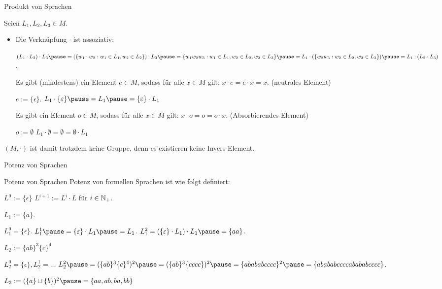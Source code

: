 \begin{frame}{Produkt von Sprachen}
	\pause 
	
	Seien $L_1, L_2, L_3 \in M$.
	
	\begin{itemize}
		\item Die Verknüpfung $\cdot$ ist assoziativ:
		\begin{itemize}
			\pitem $(L_1 \cdot L_2) \cdot L_3 \pause = (\{w_1\cdot w_2 : w_1 \in L_1, w_2 \in L_2\}) \cdot L_3 \pause = \{w_1w_2w_3 : w_1 \in L_1, w_2 \in L_2, w_3 \in L_3\} \pause = L_1 \cdot (\{w_2w_3 : w_2 \in L_2, w_3 \in L_3\}) \pause = L_1 \cdot (L_2 \cdot L_3)$.
		\end{itemize}
	
		\pitem Es gibt (mindestens) ein Element $e \in M$, sodass für alle $x \in M$ gilt: $x \cdot e = e \cdot x = x$. (neutrales Element)
		\begin{itemize}
			\pitem $e := \{\epsilon\}$.
			\pitem $L_1 \cdot \{\epsilon\} \pause = L_1 \pause = \{\epsilon\} \cdot L_1$
		\end{itemize}
	
		\pitem Es gibt ein Element $o \in M$, sodass für alle $x \in M$ gilt: $x \cdot o = o = o \cdot x$. (Absorbierendes Element)
		\begin{itemize}
			\pitem $o := \emptyset$
			\pitem $L_1 \cdot \emptyset = \emptyset = \emptyset \cdot L_1$
		\end{itemize}
	\end{itemize}

	$(M, \cdot)$ ist damit trotzdem keine Gruppe\p , denn es existieren keine Invers-Element.
\end{frame}

\begin{frame}{Potenz von Sprachen}
	
	\begin{block}{Potenz von Sprachen}
		Potenz von formellen Sprachen ist wie folgt definiert:
		\begin{itemize}
			\pitem $L^0 := \{\epsilon\}$
			\pitem $L^{i+1} := L^i \cdot L$ für $i \in \mathbb{N}_+$.
		\end{itemize}
	\end{block}

	\begin{itemize}
		\pitem $L_1 := \{a\}$.
		\begin{itemize}
			\pitem $L_1^0 = \{\epsilon\}$. \pause $L_1^1 \pause = \{\epsilon\} \cdot L_1 \pause = L_1$.
			\pitem $L_1^2 = (\{\epsilon\} \cdot L_1) \cdot L_1 \pause = \{aa\}$.
		\end{itemize}
		\pitem $L_2 := \{ab\}^3\{c\}^4$
		\begin{itemize}
			\pitem $L_2^0 = \{\epsilon\}, L_2^1 = ...$
			\pitem $L_2^2 \pause = (\{ab\}^3\{c\}^4)^2 \pause = (\{ab\}^3\{cccc\})^2 \pause = \{abababcccc\}^2 \pause = \{abababccccabababcccc\}$.
		\end{itemize}
		\pitem $L_3 := (\{a\} \cup \{b\})^2 \pause = \{aa, ab, ba, bb\}$
	\end{itemize}

\end{frame}

